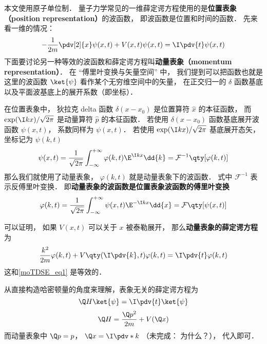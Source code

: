 

本文使用原子单位制． 量子力学常见的一维薛定谔方程使用的是\textbf{位置表象（position representation）}的波函数， 即波函数是位置和时间的函数． 先来看一维的情况：
\begin{equation}\label{moTDSE_eq1}
-\frac{1}{2m} \pdv[2]{x}\psi(x, t) + V(x,t)\psi(x,t) = \I \pdv{t} \psi(x,t)
\end{equation}
下面要讨论另一种等效的波函数和薛定谔方程叫\textbf{动量表象（momentum representation）}． 在 “傅里叶变换与矢量空间” 中， 我们提到可以把函数也就是这里的波函数 $\ket{\psi}$ 看作某个无穷维空间中的矢量， 在正交归一的 $\delta$ 函数基底以及平面波基底上的展开系数（即坐标）．

在位置表象中， 狄拉克 delta 函数 $\delta(x-x_0)$ 是位置算符 $\hat x$ 的本征函数， 而 $\exp(\I kx)/\sqrt{2\pi}$ 是动量算符 $\hat p$ 的本征函数． 若使用 $\delta(x-x_0)$ 函数基底展开波函数 $\psi(x, t)$， 系数同样为 $\psi(x, t)$． 若使用 $\exp(\I kx)/\sqrt{2\pi}$ 基底展开态矢， 坐标记为 $\psi(k, t)$
\begin{equation}\label{moTDSE_eq2}
\psi(x,t) = \frac{1}{\sqrt{2\pi}}\int_{-\infty}^{+\infty} \varphi(k,t)\E^{\I kx}\dd{k} = \mathcal{F}^{-1} \qty[\varphi(k,t)]
\end{equation}
那么我们就使用了动量表象， $\varphi(k, t)$ 就是动量表象下的波函数． 式中 $\mathcal{F}^{-1}$ 表示反傅里叶变换． 即\textbf{动量表象的波函数是位置表象波函数的傅里叶变换}
\begin{equation}
\varphi(k,t) = \frac{1}{\sqrt{2\pi}}\int_{-\infty}^{+\infty} \psi(x,t)\E^{-\I kx}\dd{x} = \mathcal{F}\qty[\psi(x, t)]
\end{equation}

可以证明， 如果 $V(x,t)$ 可以关于 $x$ 被泰勒展开， 那么\textbf{动量表象的薛定谔方程}为
\begin{equation}\label{moTDSE_eq3}
\frac{k^2}{2m}\varphi(k, t) + V\qty(\I \pdv{k}, t)\varphi(k, t) = \I \pdv{t} \varphi(k,t)
\end{equation}
这和\autoref{moTDSE_eq1} 是等效的．

从直接构造哈密顿量的角度来理解，表象无关的薛定谔方程为
\begin{equation}
\Q H\ket{\psi} = \I \pdv{t}\ket{\psi}
\end{equation}
\begin{equation}
\Q H = \frac{\Q p^2}{2m} + V(\Q x)
\end{equation}
而动量表象中 $\Q p = p$， $\Q x  = \I \pdv*{k}$ （未完成： 为什么？）， 代入即可．

